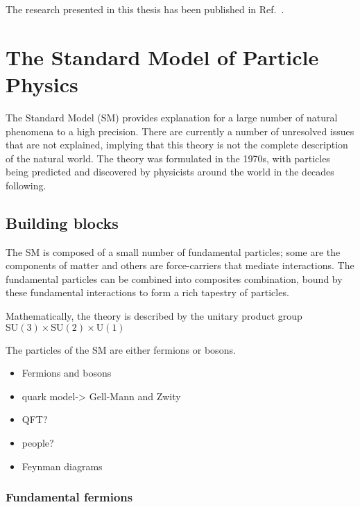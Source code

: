 The research presented in this thesis has been published in Ref.~\cite{LHCb-PAPER-2017-032}. 



\section{The Standard Model of Particle Physics}

The Standard Model (SM) provides explanation for a large number of natural phenomena to a high precision. There are currently a number of unresolved issues that are not explained, implying that this theory is not the complete description of the natural world. The theory was formulated in the 1970s, with particles being predicted and discovered by physicists around the world in the decades following.

\subsection{Building blocks}

The SM is composed of a small number of fundamental particles; some are the components of matter and others are force-carriers that mediate interactions. The fundamental particles can be combined into composites combination, bound by these fundamental interactions to form a rich tapestry of particles.

Mathematically, the theory is described by the unitary product group $\text{SU}(3)\times\text{SU}(2)\times\text{U}(1)$ 

The particles of the SM are either fermions or bosons.



{\color{Red}
\begin{itemize}
\item Fermions and bosons
\item quark model-> Gell-Mann and Zwity 
\item QFT?
\item people?
\item Feynman diagrams
\end{itemize}}

\subsubsection{Fundamental fermions}

